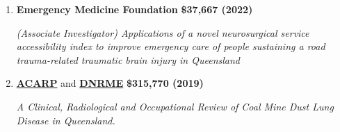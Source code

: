 \begin{enumerate}
	\item
        \textbf{Emergency Medicine Foundation}
		\textbf{\hfill \$37,667 (2022)}\par 
        \textit{(Associate Investigator) Applications of a novel neurosurgical service accessibility index to improve emergency care of people sustaining a road trauma-related traumatic brain injury in Queensland}
	\item
        \href{https://www.acarp.com.au/funding.aspx}{\textbf{ACARP}} and \href{https://www.resources.qld.gov.au/}{\textbf{DNRME}}
		\textbf{\hfill \$315,770 (2019)}\par 
        \textit{A Clinical, Radiological and Occupational Review of Coal Mine Dust Lung Disease in Queensland.}
\end{enumerate}\par